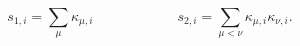 \begin{equation}
s_{1,i} = \sum_{\mu} \kappa_{\mu,i}\hspace{1in} s_{2,i} = \sum_{\mu<\nu} \kappa_{\mu,i}\kappa_{\nu,i}   .
\label{2.25c}
\end{equation}

